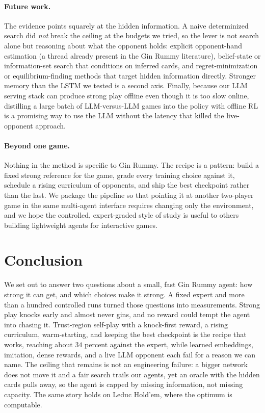 \documentclass[letterpaper]{article} %
\begin{document}
\paragraph{Future work.}
The evidence points squarely at the hidden information. A naive determinized
search did \emph{not} break the ceiling at the budgets we tried, so the lever is
not search alone but reasoning about what the opponent holds: explicit
opponent-hand estimation (a thread already present in the Gin Rummy literature),
belief-state or information-set search that conditions on inferred cards, and
regret-minimization or equilibrium-finding methods \citep{cfr,deepcfr,nfsp} that
target hidden information directly. Stronger memory than the LSTM we tested is a
second axis. Finally, because our LLM serving stack can produce strong play
offline even though it is too slow online, distilling a large batch of
LLM-versus-LLM games into the policy with offline RL is a promising way to use the
LLM without the latency that killed the live-opponent approach.

\paragraph{Beyond one game.}
Nothing in the method is specific to Gin Rummy. The recipe is a pattern: build a
fixed strong reference for the game, grade every training choice against it,
schedule a rising curriculum of opponents, and ship the best checkpoint rather
than the last. We package the pipeline so that pointing it at another two-player
game in the same multi-agent interface requires changing only the environment,
and we hope the controlled, expert-graded style of study is useful to others
building lightweight agents for interactive games.

\section{Conclusion}
We set out to answer two questions about a small, fast Gin Rummy agent: how strong
it can get, and which choices make it strong. A fixed expert and more than a
hundred controlled runs turned those questions into measurements. Strong play
knocks early and almost never gins, and no reward could tempt the agent into
chasing it. Trust-region self-play with a knock-first reward, a rising curriculum,
warm-starting, and keeping the best checkpoint is the recipe that works, reaching
about $34$ percent against the expert, while learned embeddings, imitation, dense
rewards, and a live LLM opponent each fail for a reason we can name. The ceiling
that remains is not an engineering failure: a bigger network does not move it and a
fair search trails our agents, yet an oracle with the hidden cards pulls away, so
the agent is capped by missing information, not missing capacity. The same story
holds on Leduc Hold'em, where the optimum is computable.
\end{document}
